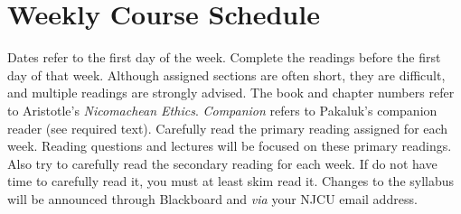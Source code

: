 \documentclass[article,oneside]{memoir}
\begin{document}
\section{Weekly Course Schedule}
Dates refer to the first day of the week. Complete the readings before the first day of that week.  Although assigned sections are often short, they are difficult, and multiple readings are strongly advised. The book and chapter numbers refer to Aristotle's \emph{Nicomachean Ethics}. \emph{Companion} refers to Pakaluk's companion reader (see required text). Carefully read the primary reading assigned for each week. Reading questions and lectures will be focused on these primary readings. Also try to carefully read the secondary reading for each week. If do not have time to carefully read it, you must at least skim read it. Changes to the syllabus will be announced through Blackboard and \emph{via} your NJCU email address.  \newline
\end{document}
